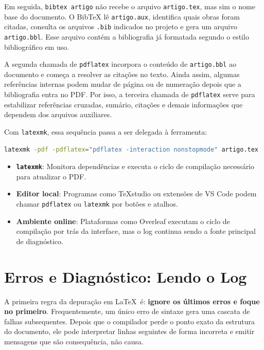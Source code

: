 Em seguida, \texttt{bibtex artigo} não recebe o arquivo \texttt{artigo.tex}, mas sim o nome base do documento. O BibTeX lê \texttt{artigo.aux}, identifica quais obras foram citadas, consulta os arquivos \texttt{.bib} indicados no projeto e gera um arquivo \texttt{artigo.bbl}. Esse arquivo contém a bibliografia já formatada segundo o estilo bibliográfico em uso.

A segunda chamada de \texttt{pdflatex} incorpora o conteúdo de \texttt{artigo.bbl} ao documento e começa a resolver as citações no texto. Ainda assim, algumas referências internas podem mudar de página ou de numeração depois que a bibliografia entra no PDF. Por isso, a terceira chamada de \texttt{pdflatex} serve para estabilizar referências cruzadas, sumário, citações e demais informações que dependem dos arquivos auxiliares.

Com \texttt{latexmk}, essa sequência passa a ser delegada à ferramenta:

\begin{lstlisting}[language=bash, caption={Ciclo automático com latexmk}]
latexmk -pdf -pdflatex="pdflatex -interaction nonstopmode" artigo.tex
\end{lstlisting}

\begin{itemize}
    \item \textbf{\texttt{latexmk}}: Monitora dependências e executa o ciclo de compilação necessário para atualizar o PDF.
    \item \textbf{Editor local}: Programas como TeXstudio ou extensões de VS Code podem chamar \texttt{pdflatex} ou \texttt{latexmk} por botões e atalhos.
    \item \textbf{Ambiente online}: Plataformas como Overleaf executam o ciclo de compilação por trás da interface, mas o log continua sendo a fonte principal de diagnóstico.
\end{itemize}

\section{Erros e Diagnóstico: Lendo o Log}

A primeira regra da depuração em \LaTeX\ é: \textbf{ignore os últimos erros e foque no primeiro}. Frequentemente, um único erro de sintaxe gera uma cascata de falhas subsequentes. Depois que o compilador perde o ponto exato da estrutura do documento, ele pode interpretar linhas seguintes de forma incorreta e emitir mensagens que são consequência, não causa.

